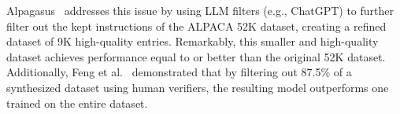 Alpagasus~\cite{alpagasus} addresses this issue 
by using LLM filters (e.g., ChatGPT)
to further filter out the kept instructions of the ALPACA 52K dataset,
creating a refined dataset of 9K high-quality entries. 
Remarkably, this smaller and high-quality
dataset achieves performance equal to or better than the original 52K dataset.
Additionally, Feng et al.~\cite{modelcollapse1} demonstrated that by
filtering out 87.5\% of a synthesized dataset using human verifiers, the resulting
model outperforms one trained on the entire dataset.

\begin{comment}
\sj{(아래 문장의 경우 이전 설명과 많이 겹쳐서 특별히 필요 없을 듯 합니다.
대신에 Fig. 2를 다를 위치에 넣어서 과도한 API invocation 문제는 언급해야할 듯 합니다.)}
\fixme{
Moreover, the ROUGE-L similarity-based data filtering process of 
the Self-Instruct methodology also involves an excessive number of ChatGPT 
API requests. This filtering process adds a new instruction to the task pool only if its ROUGE-L
similarity with any existing instructions is less than 0.7 \review{(the number is
empirically set in Self-Instruct).} While this approach effectively encourages
diversity, it results in the elimination of over half of the generated instructions.
\FIG{fig:api-inefficiency} illustrates the actual number of generated data
points over time compared to the number of ChatGPT API requests made. Initially,
most of the generated instructions are kept. However, as the number of existing
instructions increases, more than half of the new instructions are filtered out.
This trend becomes increasingly severe as the amount of data grows, highlighting
inefficiencies within the filtering process. Consequently, this inefficiency
leads to high resource and cost consumption.
}
\end{comment}
